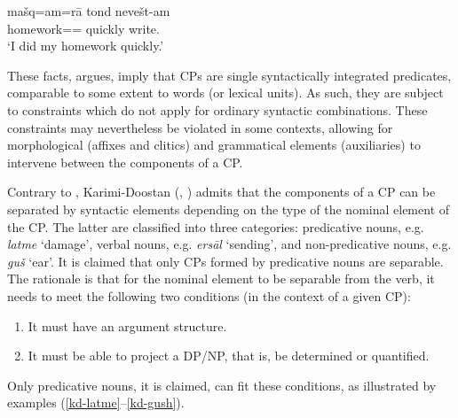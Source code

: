 \documentclass[output=paper]{langsci/langscibook}
\begin{document}
\begin{exe}
	\ex\label{goldberg-sep-do2}
	\gll ma\v{s}q=am=r\=a tond neve\v{s}t-am\\
	homework== quickly write.\\
	\glt `I did my homework quickly.' \citep[p. 134, ex. 10]{Goldberg1996}
\end{exe}

These facts,  \citet{Goldberg1996} argues, imply that CPs are single syntactically integrated predicates, comparable to some extent to words (or lexical units). As such, they are subject to constraints which do not apply for ordinary syntactic combinations. These constraints may nevertheless be violated in some contexts, allowing for morphological (affixes and clitics) and grammatical elements (auxiliaries)  to intervene between the components of a CP.


Contrary to \citet{Goldberg1996}, Karimi-Doostan (\citeyear{Karimi-Doostan1997}, \citeyear{Karimi-Doostan:2011}) admits that the components of a CP can be separated by syntactic elements depending on the type of the nominal element of the CP. The latter are classified into three categories: predicative nouns, e.g. \textit{latme} `damage', verbal nouns, e.g. \textit{ers\=al} `sending',  and non-predicative nouns, e.g. \textit{gu\v{s}} `ear'. It is claimed that only CPs formed by predicative nouns are separable. 
The rationale  is that for the nominal element to be separable from the verb, it needs to meet the following two conditions (in the context of a given CP): 

\begin{enumerate}\label{claim}
	\item It must have an argument structure.
	\item It must be able to project a DP/NP, that is, be determined or quantified.
	
\end{enumerate}

Only predicative nouns, it is claimed, can fit these conditions, as illustrated by examples (\ref{kd-latme}--\ref{kd-gush}). 
\end{document}
